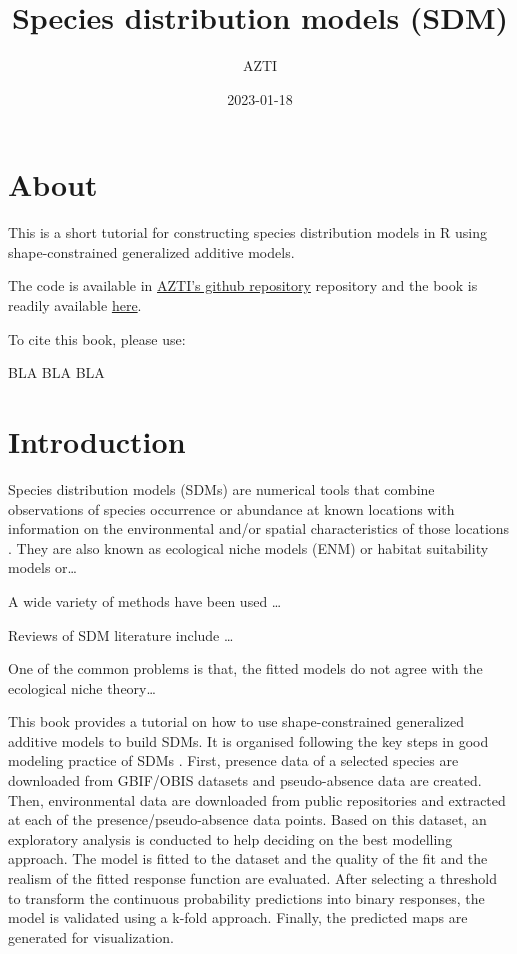 \documentclass[
]{book}
\title{Species distribution models (SDM)}
\author{AZTI}
\date{2023-01-18}
\begin{document}
\maketitle

{
\setcounter{tocdepth}{1}
\tableofcontents
}
\hypertarget{about}{%
\chapter*{About}\label{about}}

This is a short tutorial for constructing species distribution models in R using shape-constrained generalized additive models.

The code is available in \href{https://github.com/Fundacion-AZTI/SDM}{AZTI's github repository} repository and the book is readily available \href{https://fundacion-azti.github.io/SDM/}{here}.

To cite this book, please use:

BLA BLA BLA

\hypertarget{introduction}{%
\chapter{Introduction}\label{introduction}}

Species distribution models (SDMs) are numerical tools that combine observations of species occurrence or abundance at known locations with information on the environmental and/or spatial characteristics of those locations \citep{elith_etal_2009}. They are also known as ecological niche models (ENM) or habitat suitability models or\ldots{}

A wide variety of methods have been used \ldots{}

Reviews of SDM literature include \ldots{}

One of the common problems is that, the fitted models do not agree with the ecological niche theory\ldots{}

This book provides a tutorial on how to use shape-constrained generalized additive models to build SDMs. It is organised following the key steps in good modeling practice of SDMs \citep{elith_etal_2009}. First, presence data of a selected species are downloaded from GBIF/OBIS datasets and pseudo-absence data are created. Then, environmental data are downloaded from public repositories and extracted at each of the presence/pseudo-absence data points. Based on this dataset, an exploratory analysis is conducted to help deciding on the best modelling approach. The model is fitted to the dataset and the quality of the fit and the realism of the fitted response function are evaluated. After selecting a threshold to transform the continuous probability predictions into binary responses, the model is validated using a k-fold approach. Finally, the predicted maps are generated for visualization.
\end{document}
